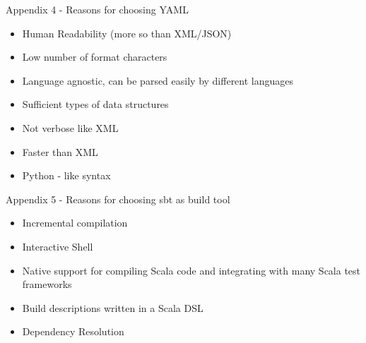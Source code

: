 \begin{frame}{Appendix 4 - Reasons for choosing YAML}
\begin{itemize}
\item Human Readability (more so than XML/JSON)
\item Low number of format characters
\item Language agnostic, can be parsed easily by different languages
\item Sufficient types of data structures
\item Not verbose like XML
\item Faster than XML
\item Python - like syntax
\end{itemize}
\end{frame}

\begin{frame}{Appendix 5 - Reasons for choosing sbt as build tool}
    \begin{itemize}
    \item Incremental compilation
    \item Interactive Shell
    \item Native support for compiling Scala code and integrating with many Scala test frameworks
    \item Build descriptions written in a Scala DSL\cite{sbt}
    \item Dependency Resolution
    \end{itemize}
\end{frame}